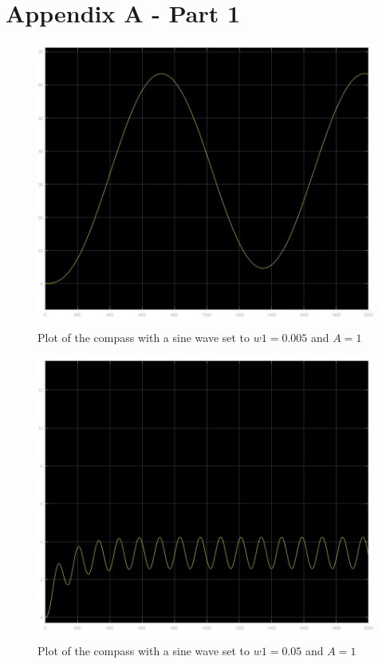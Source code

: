 \section{Appendix A - Part 1}

\begin{figure}[H]
    \centering
    \includegraphics[width=1\textwidth]{figures/1b_w0005.jpg}
    \caption{Plot of the compass with a sine wave set to $w1 = 0.005$ and $A=1$}
    \label{fig: 1b_w0005}
\end{figure}

\begin{figure}[H]
    \centering
    \includegraphics[width=1\textwidth]{figures/1b_w005.jpg}
    \caption{Plot of the compass with a sine wave set to $w1 = 0.05$ and $A=1$}
    \label{fig: 1b_w005}
\end{figure}